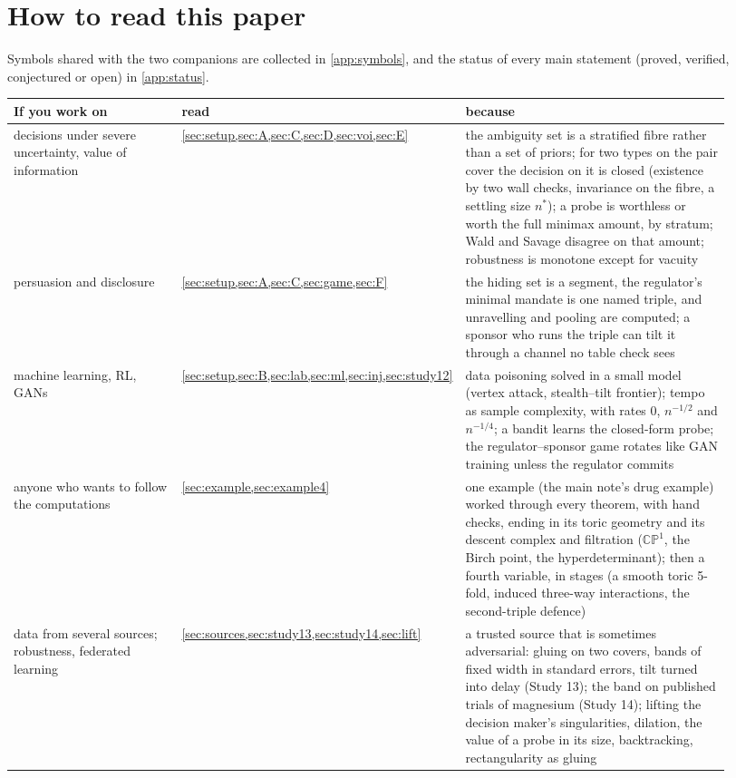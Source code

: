 \documentclass[11pt]{article}
\theoremstyle{definition}\newtheorem{definition}{Definition}\newtheorem{remark}{Remark}
\begin{document}
\newpage
\section*{How to read this paper}
Symbols shared with the two companions are collected in \cref{app:symbols}, and the status of every main statement (proved,
verified, conjectured or open) in \cref{app:status}.
\begin{table}[!h]\centering\small
\begin{tabular}{p{0.24\linewidth}p{0.3\linewidth}p{0.38\linewidth}}\toprule
If you work on & read & because\\\midrule
decisions under severe uncertainty, value of information & \cref{sec:setup,sec:A,sec:C,sec:D,sec:voi,sec:E} & the ambiguity set is a stratified fibre rather than a set of priors; for two types on the pair cover the decision on it is closed (existence by two wall checks, invariance on the fibre, a settling size $n^*$); a probe is worthless or worth the full minimax amount, by stratum; Wald and Savage disagree on that amount; robustness is monotone except for vacuity\\[2pt]
persuasion and disclosure & \cref{sec:setup,sec:A,sec:C,sec:game,sec:F} & the hiding set is a segment, the regulator's minimal mandate is one named triple, and unravelling and pooling are computed; a sponsor who runs the triple can tilt it through a channel no table check sees\\[2pt]
machine learning, RL, GANs & \cref{sec:setup,sec:B,sec:lab,sec:ml,sec:inj,sec:study12} & data poisoning solved in a small model (vertex attack, stealth--tilt frontier); tempo as sample complexity, with rates $0$, $n^{-1/2}$ and $n^{-1/4}$; a bandit learns the closed-form probe; the regulator--sponsor game rotates like GAN training unless the regulator commits\\[2pt]
anyone who wants to follow the computations & \cref{sec:example,sec:example4} & one example (the main note's drug example) worked through every theorem, with hand checks, ending in its toric geometry and its descent complex and filtration ($\mathbb{CP}^1$, the Birch point, the hyperdeterminant); then a fourth variable, in stages (a smooth toric 5-fold, induced three-way interactions, the second-triple defence)\\[2pt]
data from several sources; robustness, federated learning & \cref{sec:sources,sec:study13,sec:study14,sec:lift} & a trusted source that is sometimes adversarial: gluing on two covers, bands of fixed width in standard errors, tilt turned into delay (Study 13); the band on published trials of magnesium (Study 14); lifting the decision maker's singularities, dilation, the value of a probe in its size, backtracking, rectangularity as gluing\\[2pt]

\end{tabular}
\end{table}
\end{document}
